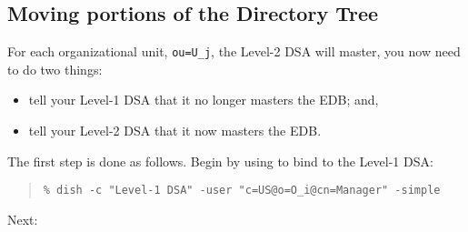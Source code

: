 \subsection	{Moving portions of the Directory Tree}
For each organizational unit, \verb"ou=U_j", the Level-2 DSA will master,
you now need to do two things:
\begin{itemize}
\item	tell your Level-1 DSA that it no longer masters the EDB;
	and,

\item	tell your Level-2 DSA that it now masters the EDB.
\end{itemize}
The first step is done as follows.
Begin by using  to bind to the Level-1 DSA:
\begin{quote}\smaller\begin{verbatim}
% dish -c "Level-1 DSA" -user "c=US@o=O_i@cn=Manager" -simple
\end{verbatim}\end{quote}
Next:
